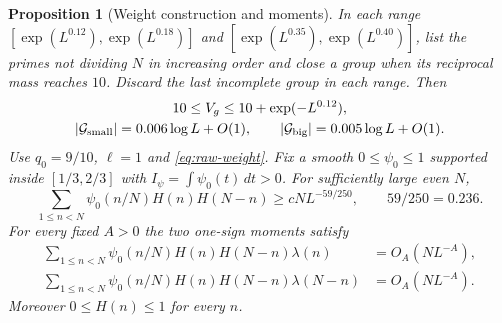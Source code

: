 \documentclass[11pt]{article}
\newtheorem{proposition}[theorem]{Proposition}
\theoremstyle{definition}
\theoremstyle{remark}
\begin{document}
\begin{proposition}[Weight construction and moments]\label{prop:mass}
In each range
$[\exp(L^{0.12}),\exp(L^{0.18})]$ and
$[\exp(L^{0.35}),\exp(L^{0.40})]$, list the primes not dividing $N$
in increasing order and close a group when its reciprocal mass reaches
$10$. Discard the last incomplete group in each range. Then
\begin{equation}\label{eq:constructed-groups}
\begin{gathered}
10\le V_g\le10+\exp(-L^{0.12}),\\
|\mathcal G_{\rm small}|=0.006\log L+O(1),\qquad
|\mathcal G_{\rm big}|=0.005\log L+O(1).
\end{gathered}
\end{equation}
Use $q_0=9/10$, $\ell=1$ and \eqref{eq:raw-weight}.
Fix a smooth $0\le\psi_0\le1$ supported inside $[1/3,2/3]$ with
$I_\psi=\int\psi_0(t)\,dt>0$.
For sufficiently large even $N$,
\begin{equation}\label{eq:positive-mass}
\sum_{1\le n<N}\psi_0(n/N)H(n)H(N-n)
\ge cNL^{-59/250},\qquad 59/250=0.236.
\end{equation}
For every fixed $A>0$ the two one-sign moments satisfy
\begin{equation}\label{eq:one-sign-moments}
\begin{split}
\sum_{1\le n<N}\psi_0(n/N)H(n)H(N-n)\lambda(n)&=O_A(NL^{-A}),\\
\sum_{1\le n<N}\psi_0(n/N)H(n)H(N-n)\lambda(N-n)&=O_A(NL^{-A}).
\end{split}
\end{equation}
Moreover $0\le H(n)\le1$ for every $n$.
\end{proposition}
\end{document}
